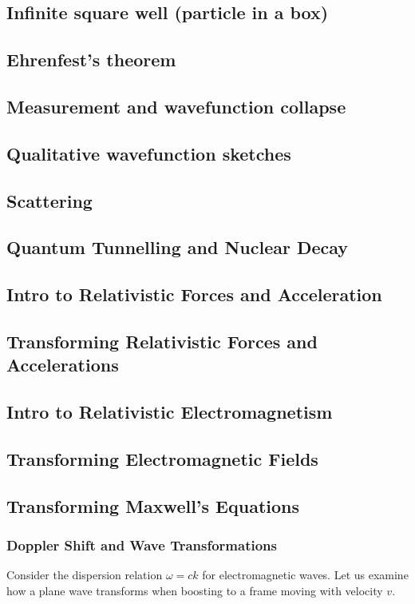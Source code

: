 \documentclass{article}
\begin{document}
\subsection{Infinite square well (particle in a box)}
\subsection{Ehrenfest's theorem}
\subsection{Measurement and wavefunction collapse}
\subsection{Qualitative wavefunction sketches}
\subsection{Scattering}
\subsection{Quantum Tunnelling and Nuclear Decay}
\subsection{Intro to Relativistic Forces and Acceleration}
\subsection{Transforming Relativistic Forces and Accelerations}
\subsection{Intro to Relativistic Electromagnetism}
\subsection{Transforming Electromagnetic Fields}

\pagebreak
\subsection{Transforming Maxwell's Equations}

\subsubsection{Doppler Shift and Wave Transformations}
Consider the dispersion relation $\omega = ck$ for electromagnetic waves. Let us examine how a plane wave transforms when boosting to a frame moving with velocity $v$.
\end{document}
